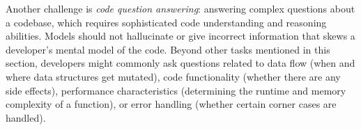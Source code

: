 Another challenge is \textit{code question answering}: answering complex questions about a codebase, which requires sophisticated code understanding and reasoning abilities. Models should not hallucinate or give incorrect information that skews a developer's mental model of the code. Beyond other tasks mentioned in this section, developers might commonly ask questions related to data flow (when and where data structures get mutated), code functionality (whether there are any side effects), performance characteristics (determining the runtime and memory complexity of a function), or error handling (whether certain corner cases are handled). 














